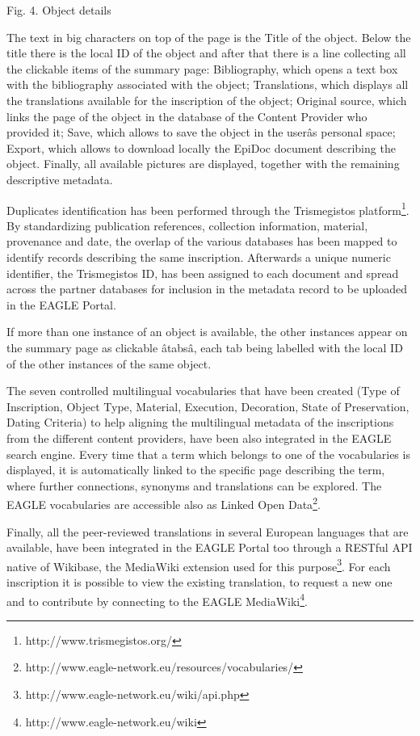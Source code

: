 Fig. 4. Object details


\bigskip

The text in big characters on top of the page is the Title of the object. Below the title there is the local ID of the
object and after that there is a line collecting all the clickable items of the summary page: Bibliography, which opens
a text box with the bibliography associated with the object; Translations, which displays all the translations
available for the inscription of the object; Original source, which links the page of the object in the database of the
Content Provider who provided it; Save, which allows to save the object in the userâs personal space; Export, which
allows to download locally the EpiDoc document describing the object. Finally, all available pictures are displayed,
together with the remaining descriptive metadata.

Duplicates identification has been performed through the Trismegistos platform\footnote{ http://www.trismegistos.org/ }.
By standardizing publication references, collection information, material, provenance and date, the overlap of the
various databases has been mapped to identify records describing the same inscription. Afterwards a unique numeric
identifier, the Trismegistos ID, has been assigned to each document and spread across the partner databases for
inclusion in the metadata record to be uploaded in the EAGLE Portal.

If more than one instance of an object is available, the other instances appear on the summary page as clickable âtabsâ,
each tab being labelled with the local ID of the other instances of the same object.

The seven controlled multilingual vocabularies that have been created (Type of Inscription, Object Type, Material,
Execution, Decoration, State of Preservation, Dating Criteria) to help aligning the multilingual metadata of the
inscriptions from the different content providers, have been also integrated in the EAGLE search engine. Every time
that a term which belongs to one of the vocabularies is displayed, it is automatically linked to the specific page
describing the term, where further connections, synonyms and translations can be explored. The EAGLE vocabularies are
accessible also as Linked Open Data\footnote{ http://www.eagle-network.eu/resources/vocabularies/}.

Finally, all the peer-reviewed translations in several European languages that are available, have been integrated in
the EAGLE Portal too through a RESTful API native of Wikibase, the MediaWiki extension used for this purpose\footnote{
http://www.eagle-network.eu/wiki/api.php }. For each inscription it is possible to view the existing translation, to
request a new one and to contribute by connecting to the EAGLE MediaWiki\footnote{ http://www.eagle-network.eu/wiki }.


